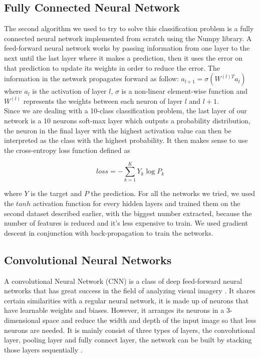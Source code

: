 \documentclass[letterpaper, 10 pt, conference]{ieeeconf}  %
\begin{document}
\subsection{Fully Connected Neural Network}
The second algorithm we used to try to solve this classification problem is a fully connected neural network implemented from scratch using the Numpy library. A feed-forward neural network works by passing information from one layer to the next until the last layer where it makes a prediction, then it uses the error on that prediction to update its weights in order to reduce the error. The information in the network propagates forward as follow: $a_{l+1} = \sigma (W^{(l)T}a_l)$ where $a_l$ is the activation of layer $l$, $\sigma$ is a non-linear element-wise function and $W^{(l)}$ represents the weights between each neuron of layer $l$ and $l+1$. \\
Since we are dealing with a 10-class classification problem, the last layer of our network is a 10 neurons soft-max layer which outputs a probability distribution, the neuron in the final layer with the highest activation value can then be interpreted as the class with the highest probability. It then makes sense to use the cross-entropy loss function defined as
\begin{center}
$$loss = - \sum_{k=1}^{K}Y_k \log{P_k}$$
\end{center}
where $Y$ is the target and $P$ the prediction.
For all the networks we tried, we used the $tanh$ activation function for every hidden layers and trained them on the second dataset described earlier, with the biggest number extracted, because the number of features is reduced and it's less expensive to train. We used gradient descent in conjunction with back-propagation to train the networks.


\subsection{Convolutional Neural Networks}
A convolutional Neural Network (CNN) is a class of deep feed-forward neural networks that has great success in the field of analyzing visual imagery \cite{wiki:cnn}. It shares certain similarities with a regular neural network, it is made up of neurons that have learnable weights and biases. However, it arranges its neurons in a 3-dimensional space and reduce the width and depth of the input image so that less neurons are needed. It is mainly consist of three types of layers, the convolutional layer, pooling layer and fully connect layer, the network can be built by stacking those layers sequentially \cite{karpathycnn}. 
\end{document}
